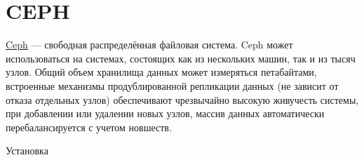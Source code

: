 \documentclass[letterpaper,10pt,russian]{sphinxmanual}
\begin{document}
\section{CEPH}
\label{index:ceph}
\href{http://ceph.com}{Ceph} — свободная распределённая файловая система. Ceph может использоваться на системах, состоящих как из нескольких машин, так и из тысяч узлов. Общий объем хранилища данных может измеряться петабайтами, встроенные механизмы продублированной репликации данных (не зависит от отказа отдельных узлов) обеспечивают чрезвычайно высокую живучесть системы, при добавлении или удалении новых узлов, массив данных автоматически перебалансируется с учетом новшеств.

Установка





\renewcommand{\indexname}{Алфавитный указатель}
\printindex
\end{document}
